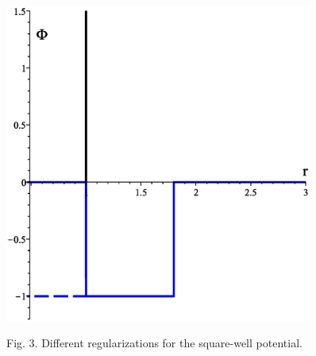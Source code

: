 \documentclass[8pt]{beamer}
\begin{document}
\begin{frame}
\begin{columns}
			\begin{figure}[htbp]
				\includegraphics[width=0.9\textwidth,angle=0]{hcsw} \\
				\parbox{0.8\textwidth}{\caption*{Fig. 3. Different regularizations for the square-well potential.
				}}
			\end{figure}
			
		\end{columns}
		
	\end{frame}
	
\end{document}
